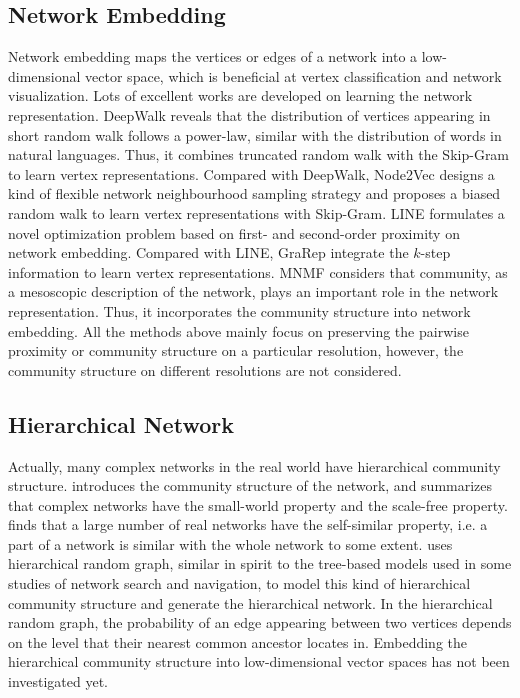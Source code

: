 \documentclass{article}
\theoremstyle{definition}
\begin{document}
	\subsection{Network Embedding}
	Network embedding maps the vertices or edges of a network into a low-dimensional vector space, which is beneficial at vertex classification and network visualization. Lots of excellent works are developed on learning the network representation. DeepWalk \cite{Perozzi2014DeepWalk} reveals that the distribution of vertices appearing in short random walk follows a power-law, similar with the distribution of words in natural languages. Thus, it combines truncated random walk \cite{fouss2007random-walk} with the Skip-Gram \cite{mikolov2013efficient} to learn vertex representations. 
	Compared with DeepWalk, Node2Vec \cite{Grover2016node2vec} designs a kind of flexible network neighbourhood sampling strategy and proposes a biased random walk to learn vertex representations with Skip-Gram. LINE \cite{Tang2015LINE} formulates a novel optimization problem based on first- and second-order proximity on network embedding. Compared with LINE, GraRep \cite{Cao2015GraRep} integrate the $k$-step information to learn vertex representations. MNMF \cite{Wang2017Community} considers that community, as a mesoscopic description of the network, plays an important role in the network representation. Thus, it incorporates the community structure into network embedding. All the methods above mainly focus on preserving the pairwise proximity or community structure on a particular resolution, however, the community structure on different resolutions are not considered. 

	\subsection{Hierarchical Network}
	Actually, many complex networks in the real world have hierarchical community structure.
	\cite{newman2003structure} introduces the community structure of the network, and summarizes that complex networks have the small-world property and the scale-free property. \cite{song2005self} finds that a large number of real networks have the self-similar property, i.e. a part of a network is similar with the whole network to some extent. 
	\cite{clauset2008hierarchical} uses hierarchical random graph, similar in spirit to the tree-based models used in some studies of network search and navigation, to model this kind of hierarchical community structure and generate the hierarchical network.
	In the hierarchical random graph, the probability of an edge appearing between two vertices depends on the level that their nearest common ancestor locates in. 
	Embedding the hierarchical community structure into low-dimensional vector spaces has not been investigated yet.
\end{document}
